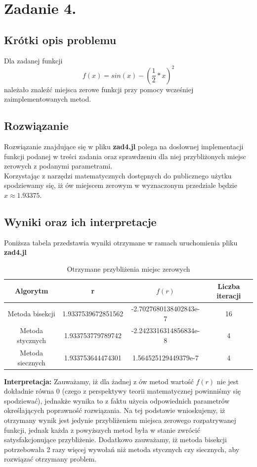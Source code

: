 \documentclass[a4paper,14pt]{report}
\begin{document}
\chapter{Zadanie 4.}
  \section{Krótki opis problemu}
  Dla zadanej funkcji
  \begin{equation}
    f(x)=sin(x)-(\frac{1}{2}*x)^{2}
  \end{equation}
  należało znaleźć miejsca zerowe funkcji przy pomocy wcześniej zaimplementowanych metod.
  \section{Rozwiązanie}
  Rozwiązanie znajdujące się w pliku \textbf{zad4.jl} polega na dosłownej implementacji funkcji podanej w treści zadania oraz sprawdzeniu dla niej przybliżonych miejsc zerowych z podanymi parametrami.\\
  Korzystając z narzędzi matematycznych dostępnych do publicznego użytku spodziewamy się, iż ów miejscem zerowym w wyznaczonym przedziale będzie $x\approx 1.93375$.
  \section{Wyniki oraz ich interpretacje}
  Poniższa tabela przedstawia wyniki otrzymane w ramach uruchomienia pliku \textbf{zad4.jl} \\
  \begin{table}[H]
    \centering
    \begin{tabular}{|c | c | c | c |} 
     \hline
     Algorytm & r & $f(r)$ & Liczba iteracji \\ [0.5ex] 
     \hline\hline
     Metoda bisekcji & 1.9337539672851562 & -2.7027680138402843e-7 & 16  \\ 
     Metoda stycznych & 1.933753779789742 & -2.2423316314856834e-8 & 4\\
     Metoda siecznych & 1.933753644474301 & 1.564525129449379e-7 & 4\\
     \hline
    \end{tabular}
    \caption{Otrzymane przybliżenia miejsc zerowych}
    \label{Zad4Wyniki}
    \end{table}
    \textbf{Interpretacja: }Zauważamy, iż dla żadnej z ów metod wartość $f(r)$ nie jest dokładnie równa 0 (czego z perspektywy teorii matematycznej powinniśmy się spodziewać), jednakże wynika to z faktu użycia odpowiednich parametrów określających poprawność rozwiązania. Na tej podstawie wnioskujemy, iż otrzymany wynik jest jedynie przybliżeniem miejsca zerowego rozpatrywanej funkcji, jednak każda z powyższych metod była w stanie zwrócić satysfakcjonujące przybliżenie. Dodatkowo zauważamy, iż metoda bisekcji potrzebowała 2 razy więcej wywołań niż metoda stycznych czy siecznych, aby rozwiązać otrzymany problem.
\end{document}
